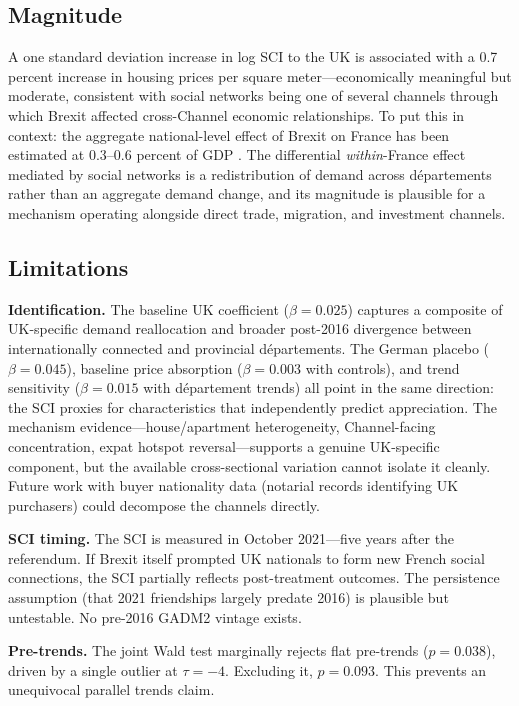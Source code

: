 \documentclass[12pt]{article}
\begin{document}
\subsection{Magnitude}

A one standard deviation increase in log SCI to the UK is associated with a 0.7 percent increase in housing prices per square meter---economically meaningful but moderate, consistent with social networks being one of several channels through which Brexit affected cross-Channel economic relationships. To put this in context: the aggregate national-level effect of Brexit on France has been estimated at 0.3--0.6 percent of GDP \citep{dhingra2017local}. The differential \textit{within}-France effect mediated by social networks is a redistribution of demand across d\'epartements rather than an aggregate demand change, and its magnitude is plausible for a mechanism operating alongside direct trade, migration, and investment channels.

\subsection{Limitations}

\textbf{Identification.} The baseline UK coefficient ($\beta = 0.025$) captures a composite of UK-specific demand reallocation and broader post-2016 divergence between internationally connected and provincial d\'epartements. The German placebo ($\beta = 0.045$), baseline price absorption ($\beta = 0.003$ with controls), and trend sensitivity ($\beta = 0.015$ with d\'epartement trends) all point in the same direction: the SCI proxies for characteristics that independently predict appreciation. The mechanism evidence---house/apartment heterogeneity, Channel-facing concentration, expat hotspot reversal---supports a genuine UK-specific component, but the available cross-sectional variation cannot isolate it cleanly. Future work with buyer nationality data (notarial records identifying UK purchasers) could decompose the channels directly.

\textbf{SCI timing.} The SCI is measured in October 2021---five years after the referendum. If Brexit itself prompted UK nationals to form new French social connections, the SCI partially reflects post-treatment outcomes. The persistence assumption (that 2021 friendships largely predate 2016) is plausible but untestable. No pre-2016 GADM2 vintage exists.

\textbf{Pre-trends.} The joint Wald test marginally rejects flat pre-trends ($p = 0.038$), driven by a single outlier at $\tau = -4$. Excluding it, $p = 0.093$. This prevents an unequivocal parallel trends claim.
\end{document}

